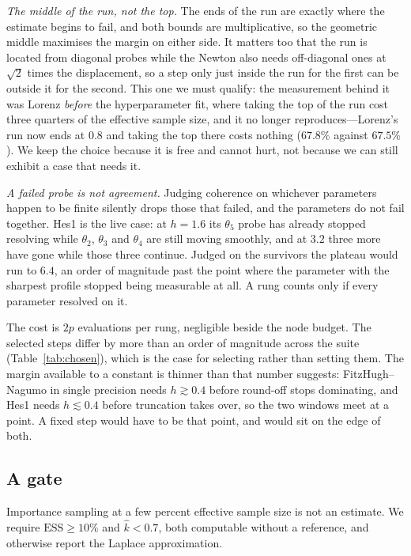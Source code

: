 \documentclass[11pt]{article}
\newcommand{\khat}{\widehat{k}}
\theoremstyle{plain}
\theoremstyle{definition}
\theoremstyle{remark}
\begin{document}
\emph{The middle of the run, not the top.} The ends of the run are exactly where the estimate
begins to fail, and both bounds are multiplicative, so the geometric middle maximises the margin
on either side. It matters too that the run is located from diagonal probes while the Newton also
needs off-diagonal ones at $\sqrt2$ times the displacement, so a step only just inside the run for
the first can be outside it for the second. This one we must qualify: the measurement behind it was
Lorenz \emph{before} the hyperparameter fit, where taking the top of the run cost three quarters of
the effective sample size, and it no longer reproduces---Lorenz's run now ends at $0.8$ and taking
the top there costs nothing ($67.8\%$ against $67.5\%$). We keep the choice because it is free and
cannot hurt, not because we can still exhibit a case that needs it.

\emph{A failed probe is not agreement.} Judging coherence on whichever parameters happen to be
finite silently drops those that failed, and the parameters do not fail together. Hes1 is the live
case: at $h = 1.6$ its $\theta_5$ probe has already stopped resolving while $\theta_2$, $\theta_3$
and $\theta_4$ are still moving smoothly, and at $3.2$ three more have gone while those three
continue. Judged on the survivors the plateau would run to $6.4$, an order of magnitude past the
point where the parameter with the sharpest profile stopped being measurable at all. A rung counts
only if every parameter resolved on it.

The cost is $2p$ evaluations per rung, negligible beside the node budget. The selected steps differ
by more than an order of magnitude across the suite (Table~\ref{tab:chosen}), which is the case for
selecting rather than setting them. The margin available to a constant is thinner than that number
suggests: FitzHugh--Nagumo in single precision needs $h \gtrsim 0.4$ before round-off stops
dominating, and Hes1 needs $h \lesssim 0.4$ before truncation takes over, so the two windows meet
at a point. A fixed step would have to be that point, and would sit on the edge of both.

\subsection{A gate}

Importance sampling at a few percent effective sample size is not an estimate. We require
$\mathrm{ESS} \ge 10\%$ and $\khat < 0.7$, both computable without a reference, and otherwise
report the Laplace approximation.
\end{document}

